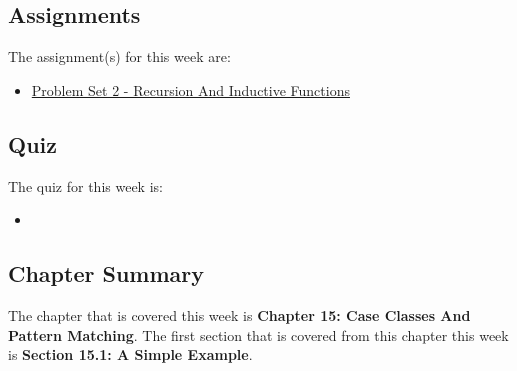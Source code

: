 \subsection{Assignments}

The assignment(s) for this week are:

\begin{itemize}
    \item \href{https://github.com/QuantumCompiler/CU/tree/main/CSPB%203155%20-%20Principles%20Of%20Programming%20Languages/Assignments/Problem%20Sets/Problem%20Set%202%20-%20Recursion%20And%20Inductive%20Functions}{Problem Set 2 - Recursion And Inductive Functions}
\end{itemize}

\subsection{Quiz}

The quiz for this week is:

\begin{itemize}
    \item {}
\end{itemize}

\newpage

\subsection{Chapter Summary}

The chapter that is covered this week is \textbf{Chapter 15: Case Classes And Pattern Matching}. The first section that is covered from this chapter this week is \textbf{Section 15.1: A Simple Example}.

